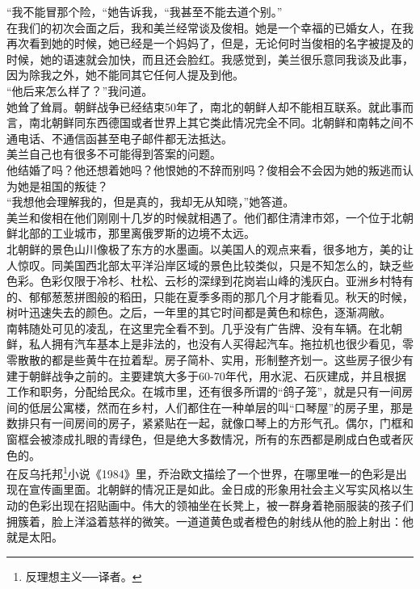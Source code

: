 “我不能冒那个险，“她告诉我，“我甚至不能去道个别。”\\

在我们的初次会面之后，我和美兰经常谈及俊相。她是一个幸福的已婚女人，在我再次看到她的时候，她已经是一个妈妈了，但是，无论何时当俊相的名字被提及的时候，她的语速就会加快，而且还会脸红。我感觉到，美兰很乐意同我谈及此事，因为除我之外，她不能同其它任何人提及到他。\\

“他后来怎么样了？”我问道。\\

她耸了耸肩。朝鲜战争已经结束50年了，南北的朝鲜人却不能相互联系。就此事而言，南北朝鲜同东西德国或者世界上其它类此情况完全不同。北朝鲜和南韩之间不通电话、不通信函甚至电子邮件都无法抵达。\\

美兰自己也有很多不可能得到答案的问题。\\

他结婚了吗？他还想着她吗？他恨她的不辞而别吗？俊相会不会因为她的叛逃而认为她是祖国的叛徒？\\

“我想他会理解我的，但是真的，我却无从知晓，”她答道。\\

美兰和俊相在他们刚刚十几岁的时候就相遇了。他们都住清津市郊，一个位于北朝鲜北部的工业城市，那里离俄罗斯的边境不太远。\\

北朝鲜的景色山川像极了东方的水墨画。以美国人的观点来看，很多地方，美的让人惊叹。同美国西北部太平洋沿岸区域的景色比较类似，只是不知怎么的，缺乏些色彩。色彩仅限于冷杉、杜松、云杉的深绿到花岗岩山峰的浅灰白。亚洲乡村特有的、郁郁葱葱拼图般的稻田，只能在夏季多雨的那几个月才能看见。秋天的时候，树叶迅速失去的颜色。之后，一年里的其它时间都是黄色和棕色，逐渐凋敝。\\

南韩随处可见的凌乱，在这里完全看不到。几乎没有广告牌、没有车辆。在北朝鲜，私人拥有汽车基本上是非法的，也没有人买得起汽车。拖拉机也很少看见，零零散散的都是些黄牛在拉着犁。房子简朴、实用，形制整齐划一。这些房子很少有建于朝鲜战争之前的。主要建筑大多于60-70年代，用水泥、石灰建成，并且根据工作和职务，分配给民众。在城市里，还有很多所谓的“鸽子笼”，就是只有一间房间的低层公寓楼，然而在乡村，人们都住在一种单层的叫“口琴屋”的房子里，那是数排只有一间房间的房子，紧紧贴在一起，就像口琴上的方形气孔。偶尔，门框和窗框会被漆成扎眼的青绿色，但是绝大多数情况，所有的东西都是刷成白色或者灰色的。\\

在反乌托邦\footnote{反理想主义──译者。}小说《1984》里，乔治欧文描绘了一个世界，在哪里唯一的色彩是出现在宣传画里面。北朝鲜的情况正是如此。金日成的形象用社会主义写实风格以生动的色彩出现在招贴画中。伟大的领袖坐在长凳上，被一群身着艳丽服装的孩子们拥簇着，脸上洋溢着慈祥的微笑。一道道黄色或者橙色的射线从他的脸上射出：他就是太阳。\\

